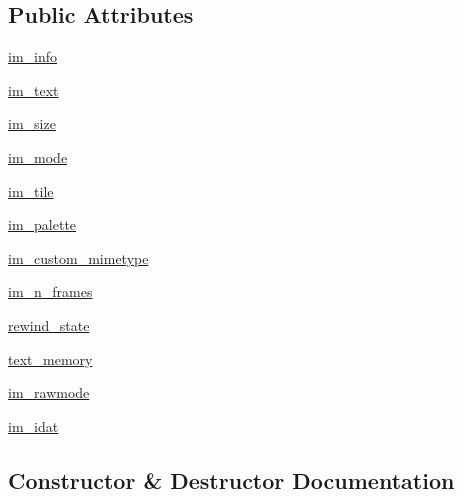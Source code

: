 \subsection*{Public Attributes}
\begin{DoxyCompactItemize}
\item 
\hyperlink{classPIL_1_1PngImagePlugin_1_1PngStream_af7fb8a995cf5c46d0af211cd7cbb5410}{im\+\_\+info}
\item 
\hyperlink{classPIL_1_1PngImagePlugin_1_1PngStream_a2bb2224906bbc596c62894ec7903567e}{im\+\_\+text}
\item 
\hyperlink{classPIL_1_1PngImagePlugin_1_1PngStream_a0a805b353f6de084794632cb970edce9}{im\+\_\+size}
\item 
\hyperlink{classPIL_1_1PngImagePlugin_1_1PngStream_a28a7051d9ae81ae432dff52b0e316f43}{im\+\_\+mode}
\item 
\hyperlink{classPIL_1_1PngImagePlugin_1_1PngStream_a827e87747ef6f1f60934243d581d487f}{im\+\_\+tile}
\item 
\hyperlink{classPIL_1_1PngImagePlugin_1_1PngStream_ac727038749c5cd647a4ae35853acb521}{im\+\_\+palette}
\item 
\hyperlink{classPIL_1_1PngImagePlugin_1_1PngStream_a2e2a6820e786cf6ed7a763ac14440bd6}{im\+\_\+custom\+\_\+mimetype}
\item 
\hyperlink{classPIL_1_1PngImagePlugin_1_1PngStream_a55774a8edd0dc042c5ad30244b7b3085}{im\+\_\+n\+\_\+frames}
\item 
\hyperlink{classPIL_1_1PngImagePlugin_1_1PngStream_a974c7369d09e33c775bf2ef74c68983a}{rewind\+\_\+state}
\item 
\hyperlink{classPIL_1_1PngImagePlugin_1_1PngStream_ae643c99d27f4f5ff2a17942de483b39b}{text\+\_\+memory}
\item 
\hyperlink{classPIL_1_1PngImagePlugin_1_1PngStream_af7b8021f1cd2f58bf6b1111a5de9c04c}{im\+\_\+rawmode}
\item 
\hyperlink{classPIL_1_1PngImagePlugin_1_1PngStream_aa15110b88930f7ba25cc1ed525f99e92}{im\+\_\+idat}
\end{DoxyCompactItemize}


\subsection{Constructor \& Destructor Documentation}
\mbox{\label{classPIL_1_1PngImagePlugin_1_1PngStream_a3918aac793d395b786702debde19877a}} 
